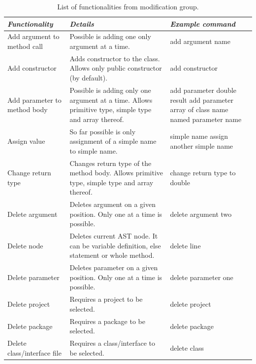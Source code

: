 \begin{table}[hbt!]
    \caption{List of functionalities from modification group.}
        \label{tab:modificationFeatures}
        \centering
        \setlength{\textwidth}{5mm} %
        \def\arraystretch{1} %
        \begin{tabular}{|p{3cm}|p{}|p{4cm}|}
            \hline 
            \emph{Functionality} & \emph{Details} & \emph{Example command} \\
            \hline
            Add argument to method call   & Possible is adding one only argument at a time.    & add argument name  \\
            \hline
            Add constructor        & Adds constructor to the class. Allows only public constructor (by default). & add constructor  \\
            \hline
            Add parameter to method body & Possible is adding only one argument at a time. Allows primitive type, simple type and array thereof.  & add parameter double result \newline add parameter array of class name named parameter name  \\
            \hline
            Assign value & So far possible is only assignment of a simple name to simple name. & simple name assign another simple name \\
            \hline
            Change return type &  Changes return type of the method body. Allows primitive type, simple type and array thereof. & change return type to double\\
            \hline
            Delete argument &  Deletes argument on a given position. Only one at a time is possible. & delete argument two\\
            \hline
            Delete node &  Deletes current AST node. It can be variable definition, else statement or whole method. & delete line\\
            \hline
            Delete parameter & Deletes parameter on a given position. Only one at a time is possible. & delete parameter one\\
            \hline
            Delete project & Requires a project to be selected. & delete project\\
            \hline
            Delete package & Requires a package to be selected. & delete package\\
            \hline
            Delete class/interface file &  Requires a class/interface to be selected. & delete class\\

\end{tabular}
\end{table}

